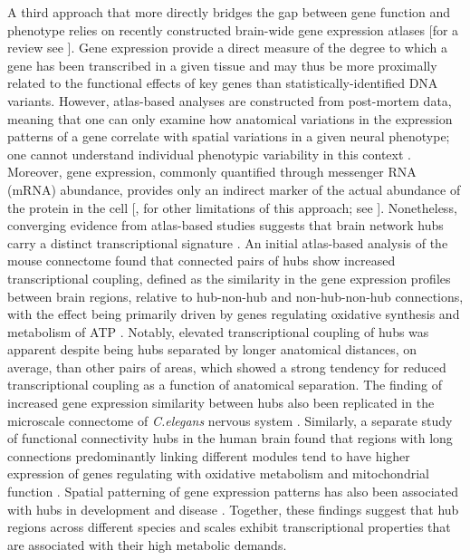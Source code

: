 A third approach that more directly bridges the gap between gene function and phenotype relies on recently constructed brain-wide gene expression atlases \citep{Hawrylycz2012} [for a review see \citep{Keil2018}]. Gene expression provide a direct measure of the degree to which a gene has been transcribed in a given tissue and may thus be more proximally related to the functional effects of key genes than statistically-identified DNA variants. However, atlas-based analyses are constructed from post-mortem data, meaning that one can only examine how anatomical variations in the expression patterns of a gene correlate with spatial variations in a given neural phenotype; one cannot understand individual phenotypic variability in this context \citep{Fornito2019}. Moreover, gene expression, commonly quantified through messenger RNA (mRNA) abundance, provides only an indirect marker of the actual abundance of the protein in the cell [\citep{Futcher1999,Greenbaum2003,Gygi1999}, for other limitations of this approach; see \citep{Fornito2019}]. Nonetheless, converging evidence from atlas-based studies suggests that brain network hubs carry a distinct transcriptional signature \citep{Arnatkeviciute2018,Fulcher2016,Rubinov2015c,Vertes2016b}. An initial atlas-based analysis of the mouse connectome found that connected pairs of hubs show increased transcriptional coupling, defined as the similarity in the gene expression profiles between brain regions, relative to hub-non-hub and non-hub-non-hub connections, with the effect being primarily driven by genes regulating oxidative synthesis and metabolism of ATP \citep{Fulcher2016}. Notably, elevated transcriptional coupling of hubs was apparent despite being hubs separated by longer anatomical distances, on average, than other pairs of areas, which showed a strong tendency for reduced transcriptional coupling as a function of anatomical separation. The finding of increased gene expression similarity between hubs also been replicated in the microscale connectome of \textit{C.elegans} nervous system \citep{Arnatkeviciute2018}. Similarly, a separate study of functional connectivity hubs in the human brain found that regions with long connections predominantly linking different modules tend to have higher expression of genes regulating with oxidative metabolism and mitochondrial function \citep{Vertes2016b}. Spatial patterning of gene expression patterns has also been associated with hubs in development \citep{Whitaker2016a} and disease \citep{Rittman2016}. Together, these findings suggest that hub regions across different species and scales exhibit transcriptional properties that are associated with their high metabolic demands.

